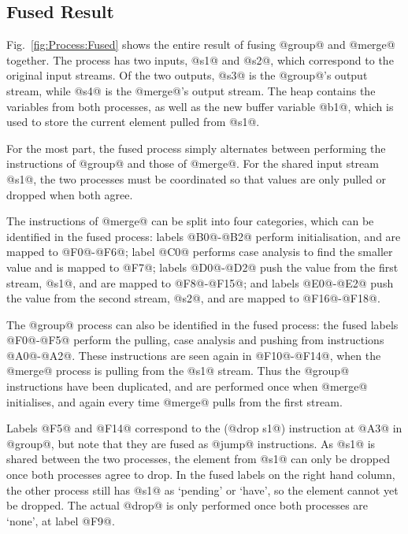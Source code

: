 \subsection{Fused Result}

Fig.~\ref{fig:Process:Fused} shows the entire result of fusing @group@ and @merge@ together.
The process has two inputs, @s1@ and @s2@, which correspond to the original input streams.
Of the two outputs, @s3@ is the @group@'s output stream, while @s4@ is the @merge@'s output stream.
The heap contains the variables from both processes, as well as the new buffer variable @b1@, which is used to store the current element pulled from @s1@.

For the most part, the fused process simply alternates between performing the instructions of @group@ and those of @merge@.
For the shared input stream @s1@, the two processes must be coordinated so that values are only pulled or dropped when both agree.

The instructions of @merge@ can be split into four categories, which can be identified in the fused process: labels @B0@-@B2@ perform initialisation, and are mapped to @F0@-@F6@; label @C0@ performs case analysis to find the smaller value and is mapped to @F7@; labels @D0@-@D2@ push the value from the first stream, @s1@, and are mapped to @F8@-@F15@; and labels @E0@-@E2@ push the value from the second stream, @s2@, and are mapped to @F16@-@F18@.

The @group@ process can also be identified in the fused process: the fused labels @F0@-@F5@ perform the pulling, case analysis and pushing from instructions @A0@-@A2@.
These instructions are seen again in @F10@-@F14@, when the @merge@ process is pulling from the @s1@ stream.
Thus the @group@ instructions have been duplicated, and are performed once when @merge@ initialises, and again every time @merge@ pulls from the first stream.

Labels @F5@ and @F14@ correspond to the (@drop s1@) instruction at @A3@ in @group@, but note that they are fused as @jump@ instructions.
As @s1@ is shared between the two processes, the element from @s1@ can only be dropped once both processes agree to drop.
In the fused labels on the right hand column, the other process still has @s1@ as `pending' or `have', so the element cannot yet be dropped.
The actual @drop@ is only performed once both processes are `none', at label @F9@.
 

